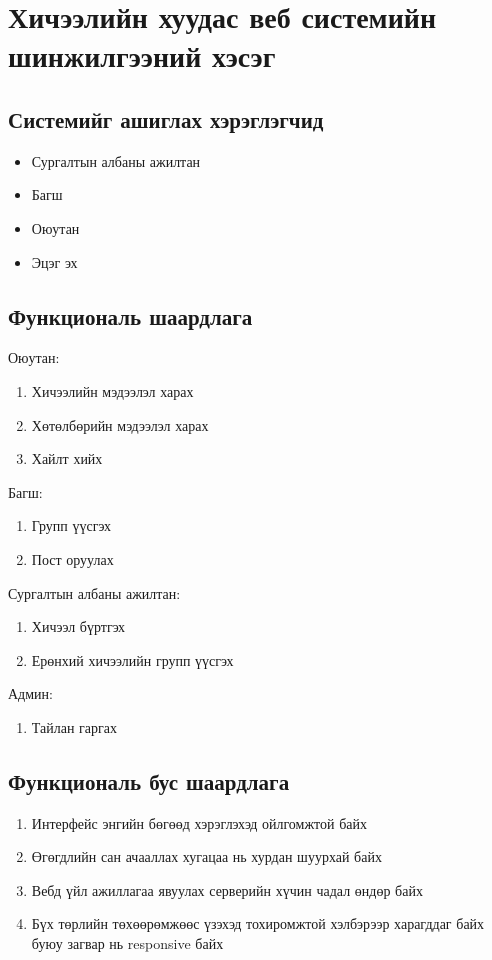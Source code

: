 
\chapter{Хичээлийн хуудас веб системийн шинжилгээний хэсэг} %
\label{Chapter2} %
\section{Системийг ашиглах хэрэглэгчид}

\begin{itemize}
\item Сургалтын албаны ажилтан
\item Багш
\item Оюутан
\item Эцэг эх

\end{itemize}
\section{Функциональ шаардлага}
Оюутан:
\begin{enumerate}
	\item Хичээлийн мэдээлэл харах
	\item Хөтөлбөрийн мэдээлэл харах
	\item Хайлт хийх
\end{enumerate}
Багш:
\begin{enumerate}
	\item Групп үүсгэх
	\item Пост оруулах 
\end{enumerate}
Сургалтын албаны ажилтан:
\begin{enumerate}
	\item Хичээл бүртгэх
	\item Ерөнхий хичээлийн групп үүсгэх
\end{enumerate}
Админ:
\begin{enumerate}
	\item Тайлан гаргах
\end{enumerate}
\section{Функциональ бус шаардлага}
\begin{enumerate}
	\item Интерфейс энгийн бөгөөд хэрэглэхэд ойлгомжтой байх
	\item Өгөгдлийн сан ачааллах хугацаа нь хурдан шуурхай байх
	\item Вебд үйл ажиллагаа явуулах серверийн хүчин чадал өндөр байх
	\item Бүх төрлийн төхөөрөмжөөс үзэхэд тохиромжтой хэлбэрээр харагддаг байх буюу загвар нь responsive байх
\end{enumerate}
\newpage
